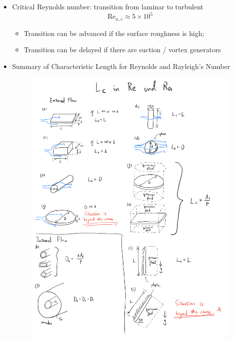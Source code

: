 \begin{itemize}
    \item Critical Reynolds number: transition from laminar to turbulent
    \begin{equation*}
        \text{Re}_{x,c} \approx 5\times 10^5
    \end{equation*}
    \begin{itemize}
        \item Transition can \color{red} be advanced \color{black} if the surface roughness is high;
        \item Transition can \color{red} be delayed \color{black} if there are suction / vortex generators 
    \end{itemize}
    \item Summary of Characteristic Length for Reynolds and Rayleigh's Number
    \begin{figure}[H]
        \centering
        \includegraphics[width=1.0\linewidth]{images/List_of_Characteristic_Length.png}
    \end{figure}
\end{itemize}
